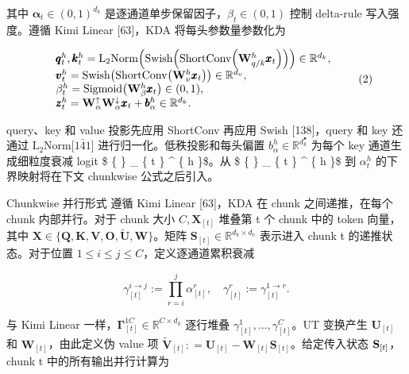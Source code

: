 其中 \(\pmb { \alpha } _ { t } \in ( 0 , 1 ) ^ { d _ { k } }\) 是逐通道单步保留因子，\(\beta _ { t } \in ( 0 , 1 )\) 控制 delta-rule 写入强度。遵循 Kimi Linear {[}63{]}，KDA 将每头参数量参数化为

\[
\begin{array}{r l} & {\pmb {q} _ {t} ^ {h}, \pmb {k} _ {t} ^ {h} = \mathrm{L} _ {2} \mathrm{Norm} \Big (\mathrm{Swish} \Big (\mathrm{ShortConv} \Big (\mathbf {W} _ {q / k} ^ {h} \pmb {x} _ {t} \Big) \Big) \Big) \in \mathbb {R} ^ {d _ {k}},} \\ & {\pmb {v} _ {t} ^ {h} = \mathrm{Swish} \big (\mathrm{ShortConv} \big (\mathbf {W} _ {v} ^ {h} \pmb {x} _ {t} \big) \big) \in \mathbb {R} ^ {d _ {v}},} \\ & {\beta_ {t} ^ {h} = \mathrm{Sigmoid} \big (\mathbf {W} _ {\beta} ^ {h} \pmb {x} _ {t} \big) \in (0, 1),} \\ & {\pmb {z} _ {t} ^ {h} = \mathbf {W} _ {\alpha} ^ {\uparrow} \mathbf {W} _ {\alpha} ^ {\downarrow} \pmb {x} _ {t} + \pmb {b} _ {\alpha} ^ {h} \in \mathbb {R} ^ {d _ {k}}.} \end{array}\tag{2}
\]

query、key 和 value 投影先应用 ShortConv 再应用 Swish {[}138{]}，query 和 key 还通过 \(\mathrm { L _ { 2 } N o r m \bar { \lbrack 1 4 1 \rbrack } }\) 进行归一化。低秩投影和每头偏置 \(b _ { \alpha } ^ { h } \in \mathbb { R } ^ { d _ { k } ^ { \bullet } }\) 为每个 key 通道生成细粒度衰减 logit \$ \{  \} \_ \{ t \} \^{} \{ h \}\$。从 \$ \{  \} \_ \{ t \} \^{} \{ h \}\$ 到 \(\alpha _ { t } ^ { h }\) 的下界映射将在下文 chunkwise 公式之后引入。

Chunkwise 并行形式 遵循 Kimi Linear {[}63{]}，KDA 在 chunk 之间递推，在每个 chunk 内部并行。对于 chunk 大小 \(C , \mathbf { X } _ { [ t ] }\) 堆叠第 t 个 chunk 中的 token 向量，其中 \(\mathbf { X } \in \{ \mathbf { Q } , \mathbf { K } , \mathbf { V } , \mathbf { O } , \mathbf { \tilde { U } } , \mathbf { W } \}\)。矩阵 \(\mathbf { S } _ { [ t ] } \in \mathbb { R } ^ { d _ { k } \times d _ { v } }\) 表示进入 chunk t 的递推状态。对于位置 \(1 \leq i \leq j \leq C\)，定义逐通道累积衰减

\[
\gamma_ {[ t ]} ^ {i \rightarrow j} := \prod_ {r = i} ^ {j} \alpha_ {[ t ]} ^ {r}, \quad \gamma_ {[ t ]} ^ {r} := \gamma_ {[ t ]} ^ {1 \rightarrow r}.\tag{3}
\]

与 Kimi Linear 一样，\(\mathbf { \Gamma } _ { [ t ] } ^ { 1  C } \in \mathbb { R } ^ { C \times d _ { k } }\) 逐行堆叠 \(\gamma _ { [ t ] } ^ { 1 } , \ldots , \gamma _ { [ t ] } ^ { C }\)。UT 变换产生 \(\mathbf { U } _ { [ t ] }\) 和 \(\mathbf { W } _ { [ t ] }\)，由此定义伪 value 项 \(\widetilde { \mathbf { V } } _ { [ t ] } : = \mathbf { U } _ { [ t ] } - \mathbf { W } _ { [ t ] } \mathbf { S } _ { [ t ] }\)。给定传入状态 \({ \bf S } _ { [ t ] }\)，chunk t 中的所有输出并行计算为

